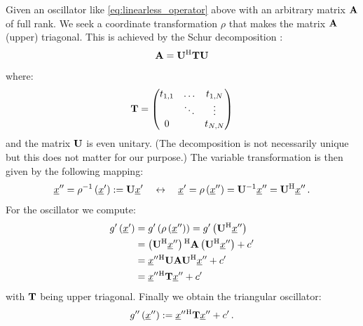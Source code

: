 \documentclass[a4paper,10pt]{article}
\begin{document}
Given an oscillator like \eqref{eq:linearless_operator} above
with an arbitrary matrix $\mathbf{A}$ of full rank. We seek a coordinate
transformation $\rho$ that makes the matrix $\mathbf{A}$ (upper) triagonal.
This is achieved by the Schur decomposition \cite{matcomp}:
\begin{equation}
 \mathbf{A} = \mathbf{U}{}^{\textnormal{H}} \mathbf{T} \mathbf{U}
\end{equation}
where:
\begin{equation}
  \mathbf{T} =
  \begin{pmatrix}
    t_{1,1} & \hdots & t_{1,N} \\
            & \ddots & \vdots \\
    0       &        & t_{N,N}
  \end{pmatrix}
\end{equation}
and the matrix $\mathbf{U}$ is even unitary.
(The decomposition is not necessarily unique but this does not matter for our purpose.)
The variable transformation is then given by the following mapping:
\begin{equation} \label{eq:transform_rho}
 \underline{x}^{\prime\prime} = \rho^{-1}\left(\underline{x}^{\prime}\right) := \mathbf{U} \underline{x}^{\prime}
 \quad \leftrightarrow \quad
 \underline{x}^{\prime} = \rho\left(\underline{x}^{\prime\prime}\right) = \mathbf{U}{}^{-1} \underline{x}^{\prime\prime} = \mathbf{U}{}^{\textnormal{H}} \underline{x}^{\prime\prime} \,.
\end{equation}
For the oscillator we compute:
\begin{equation}
\begin{split}
 g^{\prime}\left(\underline{x}^{\prime}\right)
 & = g^{\prime}\left(\rho\left(\underline{x}^{\prime\prime}\right)\right)
   = g^{\prime}\left(\mathbf{U}{}^{\textnormal{H}} \underline{x}^{\prime\prime}\right) \\
 & = \left(\mathbf{U}{}^{\textnormal{H}} \underline{x}^{\prime\prime}\right){}^{\textnormal{H}} \mathbf{A} \left(\mathbf{U}{}^{\textnormal{H}} \underline{x}^{\prime\prime}\right)
   + c^{\prime} \\
 & = \underline{x}^{\prime\prime}{}^{\textnormal{H}} \mathbf{U} \mathbf{A} \mathbf{U}{}^{\textnormal{H}} \underline{x}^{\prime\prime}
   + c^{\prime} \\
 & = \underline{x}^{\prime\prime}{}^{\textnormal{H}} \mathbf{T} \underline{x}^{\prime\prime}
   + c^{\prime}
\end{split}
\end{equation}
with $\mathbf{T}$ being upper triagonal. Finally we obtain
the triangular oscillator:
\begin{equation}
  g^{\prime\prime}\left(\underline{x}^{\prime\prime}\right) := \underline{x}^{\prime\prime}{}^{\textnormal{H}} \mathbf{T} \underline{x}^{\prime\prime} + c^{\prime} \,.
\end{equation}
\end{document}
